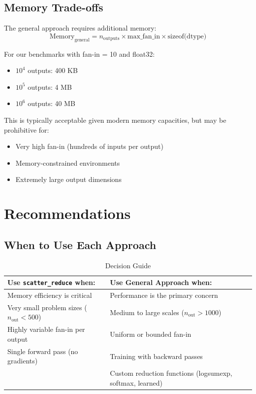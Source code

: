 \documentclass[11pt]{article}
\begin{document}
\subsection{Memory Trade-offs}

The general approach requires additional memory:
\begin{equation}
\text{Memory}_{\text{general}} = n_{\text{outputs}} \times \text{max\_fan\_in} \times \text{sizeof(dtype)}
\end{equation}

For our benchmarks with fan-in = 10 and float32:
\begin{itemize}
    \item $10^4$ outputs: 400 KB
    \item $10^5$ outputs: 4 MB
    \item $10^6$ outputs: 40 MB
\end{itemize}

This is typically acceptable given modern memory capacities, but may be prohibitive for:
\begin{itemize}
    \item Very high fan-in (hundreds of inputs per output)
    \item Memory-constrained environments
    \item Extremely large output dimensions
\end{itemize}

\section{Recommendations}

\subsection{When to Use Each Approach}

\begin{table}[H]
\centering
\caption{Decision Guide}
\begin{tabular}{@{}p{}p{}@{}}
\toprule
\textbf{Use \texttt{scatter\_reduce} when:} & \textbf{Use General Approach when:} \\
\midrule
Memory efficiency is critical & Performance is the primary concern \\
Very small problem sizes ($n_{\text{out}} < 500$) & Medium to large scales ($n_{\text{out}} > 1000$) \\
Highly variable fan-in per output & Uniform or bounded fan-in \\
Single forward pass (no gradients) & Training with backward passes \\
 & Custom reduction functions (logsumexp, softmax, learned) \\
\bottomrule
\end{tabular}
\end{table}
\end{document}
